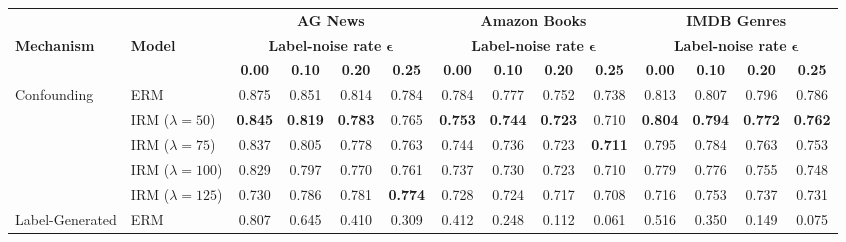 \documentclass[11pt]{article}
\theoremstyle{definition}
\theoremstyle{plain}
\begin{document}
\begin{table}[t]
\centering

\scriptsize
\setlength{\tabcolsep}{2.5pt}
\renewcommand{\arraystretch}{1.05}

\begin{tabular*}{\textwidth}{
@{\extracolsep{\fill}}
ll
cccc
cccc
cccc
@{}
}
\toprule
& &
\multicolumn{4}{c}{\textbf{AG News}} &
\multicolumn{4}{c}{\textbf{Amazon Books}} &
\multicolumn{4}{c}{\textbf{IMDB Genres}} \\
\cmidrule(lr){3-6}
\cmidrule(lr){7-10}
\cmidrule(lr){11-14}

\textbf{Mechanism} &
\textbf{Model} &
\multicolumn{4}{c}{\textbf{Label-noise rate } $\boldsymbol{\epsilon}$} &
\multicolumn{4}{c}{\textbf{Label-noise rate } $\boldsymbol{\epsilon}$} &
\multicolumn{4}{c}{\textbf{Label-noise rate } $\boldsymbol{\epsilon}$} \\

& &
\textbf{0.00} & \textbf{0.10} & \textbf{0.20} & \textbf{0.25} &
\textbf{0.00} & \textbf{0.10} & \textbf{0.20} & \textbf{0.25} &
\textbf{0.00} & \textbf{0.10} & \textbf{0.20} & \textbf{0.25} \\
\midrule

\multirow{5}{*}{Confounding}
& ERM
& 0.875 & 0.851 & 0.814 & 0.784
& 0.784 & 0.777 & 0.752 & 0.738
& 0.813 & 0.807 & 0.796 & 0.786 \\

& IRM ($\lambda=50$)
& \textbf{0.845} & \textbf{0.819} & \textbf{0.783} & 0.765
& \textbf{0.753} & \textbf{0.744} & \textbf{0.723} & 0.710
& \textbf{0.804} & \textbf{0.794} & \textbf{0.772} & \textbf{0.762} \\

& IRM ($\lambda=75$)
& 0.837 & 0.805 & 0.778 & 0.763
& 0.744 & 0.736 & 0.723 & \textbf{0.711}
& 0.795 & 0.784 & 0.763 & 0.753 \\

& IRM ($\lambda=100$)
& 0.829 & 0.797 & 0.770 & 0.761
& 0.737 & 0.730 & 0.723 & 0.710
& 0.779 & 0.776 & 0.755 & 0.748 \\

& IRM ($\lambda=125$)
& 0.730 & 0.786 & 0.781 & \textbf{0.774}
& 0.728 & 0.724 & 0.717 & 0.708
& 0.716 & 0.753 & 0.737 & 0.731 \\

\midrule

\multirow{5}{*}{Label-Generated}
& ERM
& 0.807 & 0.645 & 0.410 & 0.309
& 0.412 & 0.248 & 0.112 & 0.061
& 0.516 & 0.350 & 0.149 & 0.075 \\


\end{tabular*}
\end{table}
\end{document}
